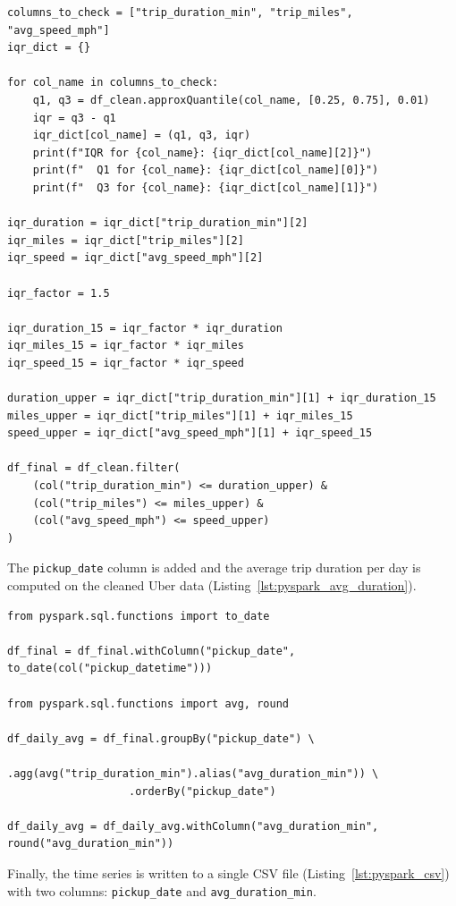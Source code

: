 \documentclass[12pt, a4paper]{article}
\begin{document}
\begin{lstlisting}[style=pystyle, caption={IQR-based outlier removal}, label=lst:pyspark_outliers]
columns_to_check = ["trip_duration_min", "trip_miles", "avg_speed_mph"]
iqr_dict = {}

for col_name in columns_to_check:
    q1, q3 = df_clean.approxQuantile(col_name, [0.25, 0.75], 0.01)
    iqr = q3 - q1
    iqr_dict[col_name] = (q1, q3, iqr)
    print(f"IQR for {col_name}: {iqr_dict[col_name][2]}")
    print(f"  Q1 for {col_name}: {iqr_dict[col_name][0]}")
    print(f"  Q3 for {col_name}: {iqr_dict[col_name][1]}")

iqr_duration = iqr_dict["trip_duration_min"][2]
iqr_miles = iqr_dict["trip_miles"][2]
iqr_speed = iqr_dict["avg_speed_mph"][2]

iqr_factor = 1.5

iqr_duration_15 = iqr_factor * iqr_duration
iqr_miles_15 = iqr_factor * iqr_miles
iqr_speed_15 = iqr_factor * iqr_speed

duration_upper = iqr_dict["trip_duration_min"][1] + iqr_duration_15
miles_upper = iqr_dict["trip_miles"][1] + iqr_miles_15
speed_upper = iqr_dict["avg_speed_mph"][1] + iqr_speed_15

df_final = df_clean.filter(
    (col("trip_duration_min") <= duration_upper) &
    (col("trip_miles") <= miles_upper) &
    (col("avg_speed_mph") <= speed_upper)
)
\end{lstlisting}

The \texttt{pickup\_date} column is added and the average trip duration per day is computed on the cleaned Uber data (Listing~\ref{lst:pyspark_avg_duration}).

\begin{lstlisting}[style=pystyle, caption={Add pickup date and calculate average daily duration}, label=lst:pyspark_avg_duration]
from pyspark.sql.functions import to_date

df_final = df_final.withColumn("pickup_date", to_date(col("pickup_datetime")))

from pyspark.sql.functions import avg, round

df_daily_avg = df_final.groupBy("pickup_date") \
                   .agg(avg("trip_duration_min").alias("avg_duration_min")) \
                   .orderBy("pickup_date")

df_daily_avg = df_daily_avg.withColumn("avg_duration_min", round("avg_duration_min"))
\end{lstlisting}

Finally, the time series is written to a single CSV file (Listing~\ref{lst:pyspark_csv}) with two columns: \texttt{pickup\_date} and \texttt{avg\_duration\_min}.
\end{document}
